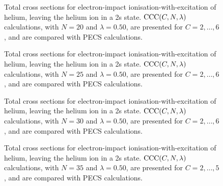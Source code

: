\documentclass[]{article}
\begin{document}
\begin{figure}[h]
  \begin{center}
    
  \end{center}
  \caption[TICS-with-excitation: $\mathrm{CCC}\lr{C, 20, 0.50}$]{
    Total cross sections for electron-impact ionisation-with-excitation of
    helium, leaving the helium ion in a 2s state.
    $\mathrm{CCC}(C, N, \lambda)$ calculations, with $N = 20$ and
    $\lambda = 0.50$, are presented for $C = 2, \dotsc, 6$, and are compared
    with PECS \cite{PhysRevA.81.022716} calculations.
  }
  \label{fig:cs_tics_ie_n_20}
\end{figure}

\begin{figure}[h]
  \begin{center}
    
  \end{center}
  \caption[TICS-with-excitation: $\mathrm{CCC}\lr{C, 25, 0.50}$]{
    Total cross sections for electron-impact ionisation-with-excitation of
    helium, leaving the helium ion in a 2s state.
    $\mathrm{CCC}(C, N, \lambda)$ calculations, with $N = 25$ and
    $\lambda = 0.50$, are presented for $C = 2, \dotsc, 6$, and are compared
    with PECS \cite{PhysRevA.81.022716} calculations.
  }
  \label{fig:cs_tics_ie_n_25}
\end{figure}

\begin{figure}[h]
  \begin{center}
    
  \end{center}
  \caption[TICS-with-excitation: $\mathrm{CCC}\lr{C, 30, 0.50}$]{
    Total cross sections for electron-impact ionisation-with-excitation of
    helium, leaving the helium ion in a 2s state.
    $\mathrm{CCC}(C, N, \lambda)$ calculations, with $N = 30$ and
    $\lambda = 0.50$, are presented for $C = 2, \dotsc, 6$, and are compared
    with PECS \cite{PhysRevA.81.022716} calculations.
  }
  \label{fig:cs_tics_ie_n_30}
\end{figure}

\begin{figure}[h]
  \begin{center}
    
  \end{center}
  \caption[TICS-with-excitation: $\mathrm{CCC}\lr{C, 35, 0.50}$]{
    Total cross sections for electron-impact ionisation-with-excitation of
    helium, leaving the helium ion in a 2s state.
    $\mathrm{CCC}(C, N, \lambda)$ calculations, with $N = 35$ and
    $\lambda = 0.50$, are presented for $C = 2, \dotsc, 5$, and are compared
    with PECS \cite{PhysRevA.81.022716} calculations.
  }
  \label{fig:cs_tics_ie_n_35}
\end{figure}
\end{document}
